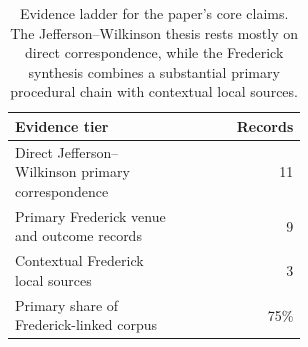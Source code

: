\begin{table}[t]
\centering
\small
\begin{tabular}{p{0.58\linewidth}r}
\toprule
Evidence tier & Records \\
\midrule
Direct Jefferson--Wilkinson primary correspondence & 11 \\
Primary Frederick venue and outcome records & 9 \\
Contextual Frederick local sources & 3 \\
Primary share of Frederick-linked corpus & 75\% \\
\bottomrule
\end{tabular}
\caption{Evidence ladder for the paper's core claims. The Jefferson--Wilkinson thesis rests mostly on direct correspondence, while the Frederick synthesis combines a substantial primary procedural chain with contextual local sources.}
\label{tab:evidence}
\end{table}

